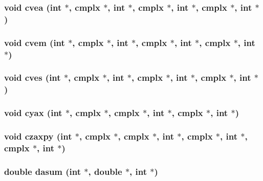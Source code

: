 \subsubsection{\setlength{\rightskip}{0pt plus 5cm}void cvea (int $\ast$, {\bf cmplx} $\ast$, int $\ast$, {\bf cmplx} $\ast$, int $\ast$, {\bf cmplx} $\ast$, int $\ast$)}\label{essl_8h_a98d57fb30a1a4f991b0e3056bc2b3a2}


\subsubsection{\setlength{\rightskip}{0pt plus 5cm}void cvem (int $\ast$, {\bf cmplx} $\ast$, int $\ast$, {\bf cmplx} $\ast$, int $\ast$, {\bf cmplx} $\ast$, int $\ast$)}\label{essl_8h_bd7fd24670e83de02fcaf4db7be8fa2e}


\subsubsection{\setlength{\rightskip}{0pt plus 5cm}void cves (int $\ast$, {\bf cmplx} $\ast$, int $\ast$, {\bf cmplx} $\ast$, int $\ast$, {\bf cmplx} $\ast$, int $\ast$)}\label{essl_8h_9a182551ce450558f91b6a1b6bb905fb}


\subsubsection{\setlength{\rightskip}{0pt plus 5cm}void cyax (int $\ast$, {\bf cmplx} $\ast$, {\bf cmplx} $\ast$, int $\ast$, {\bf cmplx} $\ast$, int $\ast$)}\label{essl_8h_d88a4ae6d59deb33039329fd107ba349}


\subsubsection{\setlength{\rightskip}{0pt plus 5cm}void czaxpy (int $\ast$, {\bf cmplx} $\ast$, {\bf cmplx} $\ast$, int $\ast$, {\bf cmplx} $\ast$, int $\ast$, {\bf cmplx} $\ast$, int $\ast$)}\label{essl_8h_ddbd982f2f77f8d5bae1d2613c6891e6}


\subsubsection{\setlength{\rightskip}{0pt plus 5cm}double dasum (int $\ast$, double $\ast$, int $\ast$)}\label{essl_8h_82bfdfaf7663303219596188967ff08c}


